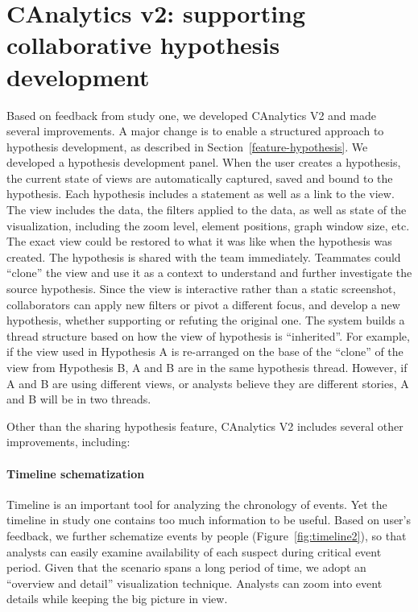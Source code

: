 \section{CAnalytics v2: supporting collaborative hypothesis development}

Based on feedback from study one, we developed CAnalytics V2 and made several improvements. A major change is to enable a structured approach to hypothesis development, as described in Section~\ref{feature-hypothesis}. We developed a hypothesis development panel. When the user creates a hypothesis,
the current state of views are automatically captured, saved and bound to
the hypothesis. Each hypothesis includes a statement as well as a link to the view.
The view includes the data, the filters applied to the data, as well as state of
the visualization, including the zoom level, element positions, graph window size, etc. The exact view could be restored to what it was like when the
hypothesis was created. The hypothesis is shared with the team immediately.
Teammates could ``clone'' the view and use it as a context to understand and further investigate the source hypothesis. Since the view is interactive rather than a static screenshot, collaborators can apply new filters or pivot a different focus, and develop a new hypothesis,
whether supporting or refuting the original one. The system builds a thread structure based
on how the view of hypothesis is ``inherited''. For example, if the view used in
Hypothesis A is re-arranged on the base of the ``clone'' of the view from Hypothesis B, A and B
are in the same hypothesis thread. However, if A and B are using different
views, or analysts believe they are different stories, A and B will be in two
threads.

Other than the sharing hypothesis feature, CAnalytics V2 includes several other improvements, including:

\paragraph{Timeline schematization}
Timeline is an important tool for analyzing the chronology of events. Yet the timeline in study one contains too much information to be useful. Based on user's feedback, we further schematize events by people (Figure~\ref{fig:timeline2}), so that analysts can easily examine availability of each suspect during critical event period. Given that the scenario spans a long period of time, we adopt an ``overview and detail'' visualization technique. Analysts can zoom into event details while keeping the big picture in view. 

